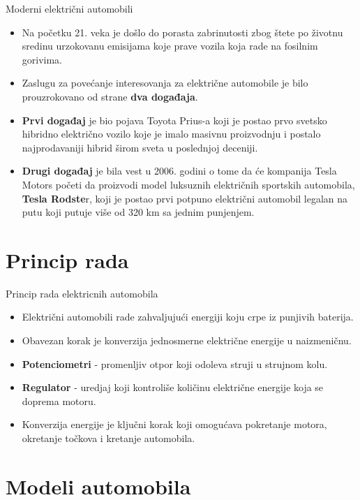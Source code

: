 \documentclass[11pt]{beamer}
\begin{document}
\begin{frame}{Moderni električni automobili}
\begin{itemize}
    \item Na početku 21. veka je došlo do porasta zabrinutosti zbog štete po životnu sredinu urzokovanu emisijama koje prave vozila koja rade na fosilnim gorivima.
    \item Zaslugu za povećanje interesovanja za električne automobile je bilo prouzrokovano od strane \textbf{dva događaja}.
    \item \textbf{Prvi događaj} je bio pojava Toyota Prius-a koji je postao prvo svetsko hibridno električno vozilo koje je imalo masivnu proizvodnju i postalo najprodavaniji hibrid širom sveta u poslednjoj deceniji.
    \item \textbf{Drugi događaj} je bila vest u 2006. godini o tome da će kompanija Tesla Motors početi da proizvodi model luksuznih električnih sportskih automobila, \textbf{Tesla Rodste}r, koji je postao prvi potpuno električni automobil legalan na putu koji putuje više od 320 km sa jednim punjenjem.
\end{itemize}
\end{frame}

\section{Princip rada}
\begin{frame}{Princip rada elektricnih automobila}
\begin{itemize}
\item Električni automobili rade zahvaljujući energiji koju crpe iz punjivih baterija.
\item Obavezan korak je konverzija jednosmerne električne energije u naizmeničnu.
\item \textbf{Potenciometri} - promenljiv otpor koji odoleva struji u strujnom kolu.
\item \textbf{Regulator} - uredjaj koji kontroliše količinu električne energije koja se doprema motoru.
\item Konverzija energije je ključni korak koji omogućava pokretanje motora, okretanje točkova i kretanje automobila.
\end{itemize}
\end{frame}

\section{Modeli automobila}
\end{document}
